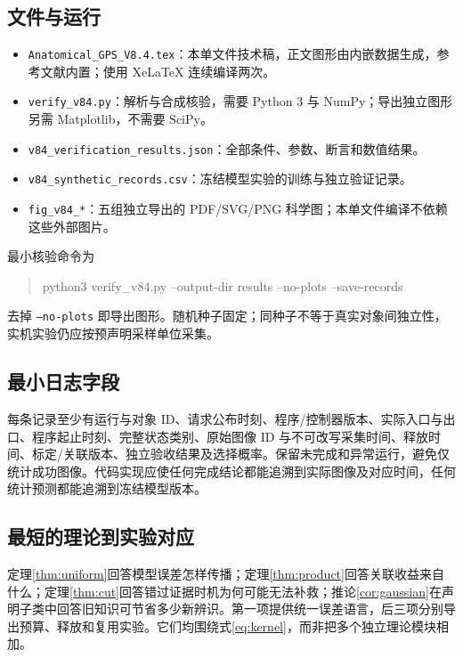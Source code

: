\documentclass[11pt,a4paper,fontset=fandol]{ctexart}
\theoremstyle{definition}
\theoremstyle{remark}
\numberwithin{equation}{section}
\begin{document}
\subsection{文件与运行}
\begin{itemize}
\item \texttt{Anatomical\_GPS\_V8.4.tex}：本单文件技术稿，正文图形由内嵌数据生成，参考文献内置；使用 XeLaTeX 连续编译两次。
\item \texttt{verify\_v84.py}：解析与合成核验，需要 Python 3 与 NumPy；导出独立图形另需 Matplotlib，不需要 SciPy。
\item \texttt{v84\_verification\_results.json}：全部条件、参数、断言和数值结果。
\item \texttt{v84\_synthetic\_records.csv}：冻结模型实验的训练与独立验证记录。
\item \texttt{fig\_v84\_*}：五组独立导出的 PDF/SVG/PNG 科学图；本单文件编译不依赖这些外部图片。
\end{itemize}
最小核验命令为
\begin{quote}\ttfamily\small
python3 verify\_v84.py --output-dir results --no-plots --save-records
\end{quote}
去掉 \texttt{--no-plots} 即导出图形。随机种子固定；同种子不等于真实对象间独立性，实机实验仍应按预声明采样单位采集。

\subsection{最小日志字段}
每条记录至少有运行与对象 ID、请求公布时刻、程序/控制器版本、实际入口与出口、程序起止时刻、完整状态类别、原始图像 ID 与不可改写采集时间、释放时间、标定/关联版本、独立验收结果及选择概率。保留未完成和异常运行，避免仅统计成功图像。代码实现应使任何完成结论都能追溯到实际图像及对应时间，任何统计预测都能追溯到冻结模型版本。

\subsection{最短的理论到实验对应}
定理\ref{thm:uniform}回答模型误差怎样传播；定理\ref{thm:product}回答关联收益来自什么；定理\ref{thm:cut}回答错过证据时机为何可能无法补救；推论\ref{cor:gaussian}在声明子类中回答旧知识可节省多少新辨识。第一项提供统一误差语言，后三项分别导出预算、释放和复用实验。它们均围绕式\eqref{eq:kernel}，而非把多个独立理论模块相加。
\end{document}
